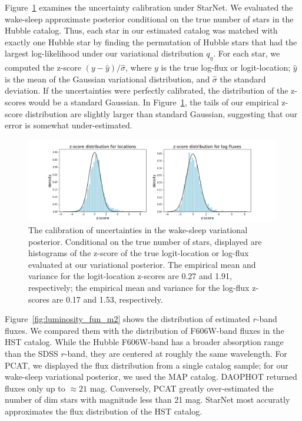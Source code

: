 Figure~\ref{fig:z-score_calibration} examines the uncertainty calibration under StarNet. We evaluated the wake-sleep approximate posterior 
conditional on the true number of stars in the Hubble catalog. 
Thus, each star in our estimated catalog was matched with exactly one Hubble star
by finding the permutation of Hubble stars that had the largest log-likelihood under our variational distribution $q_\eta$. For each star, we computed the z-score $(y - \hat y) / \hat \sigma$, where $y$ is the true log-flux or 
logit-location; $\hat y$ is the mean of the Gaussian variational distribution, and $\hat\sigma$ the standard deviation.
If the uncertainties were perfectly calibrated, the distribution of the z-scores would be a standard Gaussian. 
In Figure~\ref{fig:z-score_calibration}, the tails of our empirical z-score distribution are slightly larger than standard Gaussian, suggesting that our error is somewhat under-estimated. 

\begin{figure}[ht]
    \centering
    \includegraphics[width=0.99\textwidth]{figures/z-score_calibration.png}
    \caption{The calibration of uncertainties in the wake-sleep variational posterior. 
    Conditional on the true number of stars, displayed are histograms of the z-score of the true logit-location or log-flux evaluated at our variational posterior. 
    The empirical mean and variance for the logit-location z-scores are 0.27 and 1.91, respectively; the empirical mean and variance for the log-flux z-scores are 0.17 and 1.53, respectively. 
}
    \label{fig:z-score_calibration}
\end{figure}

Figure~\ref{fig:luminosity_fun_m2} shows the distribution of estimated $r$-band fluxes. We compared them 
with the distribution of F606W-band fluxes in the HST catalog. While the Hubble F606W-band has a broader absorption range than the SDSS $r$-band, they are centered at roughly the same wavelength. For PCAT, we displayed the flux distribution from a single catalog sample; for our wake-sleep variational 
posterior, we used the MAP catalog. DAOPHOT returned fluxes only up to $\approx21$ mag.
Conversely, PCAT greatly over-estimated the number of dim stars with magnitude less than 21 mag. StarNet most accuratly approximates the flux distribution of the HST catalog. 

